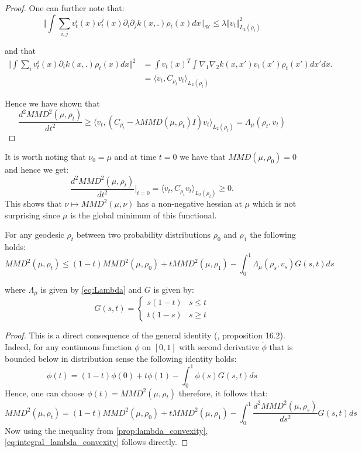 \begin{proof}
One can further note that:
\[
\Vert\int\sum_{i,j}v_{t}^{i}(x)v_{t}^{j}(x)\partial_{i}\partial_{j}k(x,.)\rho_{t}(x)dx\Vert_{\mathcal{H}}\leq\lambda\Vert v_{t}\Vert_{L_{2}(\rho_{t})}^{2}
\]

and that 
\begin{align*}
\Vert\int\sum_{i}v_{t}^{i}(x)\partial_{i}k(x,.)\rho_{t}(x)dx\Vert^{2} & =\int v_{t}(x)^{T}\int\nabla_{1}\nabla_{2}k(x,x')v_{t}(x')\rho_{t}(x')dx'dx.\\
 & =\langle v_{t},C_{\rho_{t}}v_{t}\rangle_{L_{2}(\rho_{t})}
\end{align*}

Hence we have shown that 
\[
\frac{d^{2}MMD^{2}(\mu,\rho_{t})}{dt^{2}}\geq\langle v_{t},(C_{\rho_{t}}-\lambda MMD(\mu,\rho_{t})I)v_{t}\rangle_{L_{2}(\rho_{t})}=\Lambda_{\mu}(\rho_{t},v_{t})
\]
\end{proof}
%
It is worth noting that $\nu_{0}=\mu$ and at time $t=0$ we have
that $MMD(\mu,\rho_{0})=0$ and hence we get:
\[
\frac{d^{2}MMD^{2}(\mu,\rho_{t})}{dt^{2}}\vert_{t=0}=\langle v_{t},C_{\rho_{t}}v_{t}\rangle_{L_{2}(\rho_{t})}\geq0.
\]
This shows that $\nu\mapsto MMD^{2}(\mu,\nu)$ has a non-negative
hessian at $\mu$ which is not surprising since $\mu$ is the global
minimum of this functional.
\begin{corollary}
For any geodesic $\rho_{t}$ between two probability distributions
$\rho_{0}$ and $\rho_{1}$ the following holds:
\begin{equation}
MMD^{2}(\mu,\rho_{t})\leq(1-t)MMD^{2}(\mu,\rho_{0})+tMMD^{2}(\mu,\rho_{1})-\int_{0}^{1}\Lambda_{\mu}(\rho_{s},v_{s})G(s,t)ds\label{eq:integral_lambda_convexity}
\end{equation}

where $\Lambda_{\mu}$ is given by \ref{eq:Lambda} and $G$ is given
by:
\[
G(s,t)=\begin{cases}
s(1-t) & s\leq t\\
t(1-s) & s\geq t
\end{cases}
\]
\end{corollary}
%
\begin{proof}
This is a direct consequence of the general identity (\cite{Villani:2009},
proposition 16.2). Indeed, for any continuous function $\phi$ on
$[0,1]$ with second derivative $\ddot{\phi}$ that is bounded below
in distribution sense the following identity holds:
\[
\phi(t)=(1-t)\phi(0)+t\phi(1)-\int_{0}^{1}\ddot{\phi}(s)G(s,t)ds
\]
Hence, one can choose $\phi(t)=MMD^{2}(\mu,\rho_{t})$ therefore,
it follows that:
\[
MMD^{2}(\mu,\rho_{t})=(1-t)MMD^{2}(\mu,\rho_{0})+tMMD^{2}(\mu,\rho_{1})-\int_{0}^{1}\frac{d^{2}MMD^{2}(\mu,\rho_{s})}{ds^{2}}G(s,t)ds
\]
Now using the inequality from \ref{prop:lambda_convexity}, \ref{eq:integral_lambda_convexity}
follows directly. 
\end{proof}
